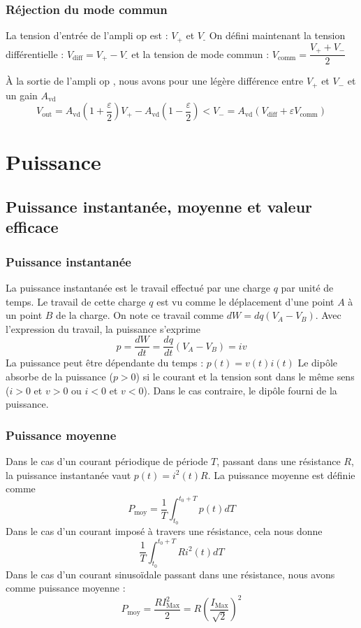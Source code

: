 \subsection{Réjection du mode commun}
La tension d'entrée de l'ampli op est : $V_\text{+}$ et $V_\text{-}$
On défini maintenant la tension différentielle : $V_\text{diff} = V_\text{+} - V_\text{-}$ et la tension de mode commun : $V_\text{comm} = \dfrac{V_+ + V_-}{2}$

À la sortie de l'ampli op , nous avons pour une légère différence entre $V_+$ et $V_-$ et un gain $A_\text{vd}$ 
\begin{equation}
V_\text{out} = A_\text{vd} \left(1+\frac{\varepsilon}{2}\right)V_+ - A_\text{vd} \left(1-\frac{\varepsilon}{2}\right)<V_- =A_\text{vd}(V_\text{diff}+\varepsilon V_\text{comm})
\end{equation}

\chapter{Puissance}
\section{Puissance instantanée, moyenne et valeur efficace}
\subsection{Puissance instantanée}
La puissance instantanée est le travail effectué par une charge $q$ par unité de temps. Le travail de cette charge $q$ est vu comme le déplacement d'une point $A$ à un point $B$ de la charge. On note ce travail comme $dW = dq \left(V_A-V_B\right)$. Avec l'expression du travail, la puissance s'exprime 
\begin{equation}
p=\dfrac{dW}{dt}=\dfrac{dq}{dt}\left(V_A-V_B\right)=i v
\end{equation}
La puissance peut être dépendante du temps : $p(t) = v(t) i(t)$\newline
Le dipôle absorbe de la puissance ($p>0$) si le courant et la tension sont dans le même sens ($i>0$ et $v>0$ ou $i<0$ et $v<0$). 
Dans le cas contraire, le dipôle fourni de la puissance.
\subsection{Puissance moyenne}
Dans le cas d'un courant périodique de période $T$, passant dans une résistance $R$, la puissance instantanée vaut $p(t)=i^2(t)R$. La puissance moyenne est définie comme 
\begin{equation}
P_\text{moy} = \frac{1}{T} \int_{t_0}^{t_0+T}{p(t)dT}
\end{equation}
Dans le cas d'un courant imposé à travers une résistance, cela nous donne 
$$ \frac{1}{T}\int_{t_0}^{t_0+T}{Ri^2(t)dT}$$
Dans le cas d'un courant sinusoïdale passant dans une résistance, nous avons comme puissance moyenne : 
$$P_\text{moy}=\frac{RI_\text{Max}^2}{2}=R\left(\frac{I_\text{Max}}{\sqrt{2}}\right)^2$$

